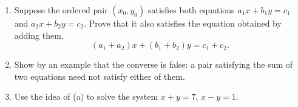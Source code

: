 \begin{enumerate}
\item[(a)] Suppose the ordered pair $(x_0,y_0)$ satisfies both equations $a_1x+b_1y=c_1$ and $a_2x+b_2y=c_2$. Prove that it also satisfies the equation obtained by adding them,
\[(a_1+a_2)x+(b_1+b_2)y=c_1+c_2.\]
\item[(b)] Show by an example that the converse is false: a pair satisfying the sum of two equations need not satisfy either of them.
\item[(c)] Use the idea of (a) to solve the system $x+y=7$, $x-y=1$.
\end{enumerate}
